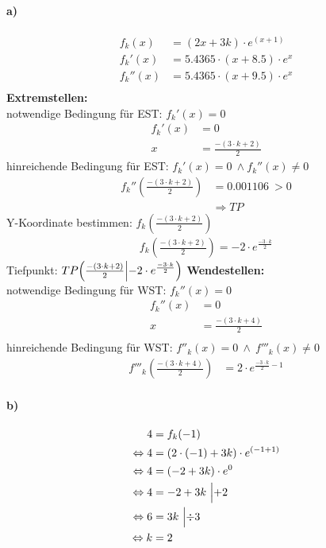 \documentclass[a4paper, 12pt]{report}
\begin{document}
	\paragraph{a)}
	\large
	\begin{align*}
		f_k(x) &= (2x + 3k) \cdot e^{(x+1)} \\
		f_k'(x) &= 5.4365 \cdot (x + 8.5) \cdot e^x \\
		f_k''(x) &= 5.4365 \cdot (x + 9.5) \cdot e^x \\
	\end{align*}
	\textbf{Extremstellen:} \\
	notwendige Bedingung für EST: $f_k'(x) = 0$
	\begin{align*}
		f_k'(x) &= 0 \\
		x &= \frac{-(3 \cdot k + 2)}{2}
	\end{align*}
	hinreichende Bedingung für EST: $f_k'(x) = 0\ \land f_k''(x) \neq 0$
	\begin{align*}
		f_k''(\frac{-(3 \cdot k + 2)}{2}) &= 0.001106\ > 0 \\
		&\Rightarrow TP
	\end{align*}
	Y-Koordinate bestimmen: $f_k(\frac{-(3 \cdot k + 2)}{2})$ \\
	\begin{align*}
		f_k(\frac{-(3 \cdot k + 2)}{2})= -2 \cdot e^{\frac{-3 \cdot k}{2}}
	\end{align*}
	Tiefpunkt: $
	TP\Bigl(\frac{-(3 \cdot k + 2)}{2}\Bigl| -2 \cdot e^{\frac{-3 \cdot k}{2}}\Bigl)$
	\newpage\noindent
	\textbf{Wendestellen:}
	\\
	notwendige Bedingung für WST: $f_k''(x) = 0$ \\
	\begin{align*}
		f_k''(x) &= 0 \\
		x &= \frac{-(3 \cdot k + 4)}{2} \\
	\end{align*}
	hinreichende Bedingung für WST: $f''_k(x) = 0\ \land\ f'''_k(x) \ne 0$\\
	\begin{align*}
		f'''_k(\frac{-(3 \cdot k + 4)}{2}) &= 2 \cdot e^{\frac{-3 \cdot k}{2} - 1}
	\end{align*}
	\paragraph{b)}
	\begin{align*}
		4 &= f_k(-1) \\
		\Leftrightarrow 4 &= (2 \cdot (-1) + 3k) \cdot e^{(-1+1)} \\
		\Leftrightarrow 4 &= (-2 + 3k) \cdot e^0 \\
		\Leftrightarrow 4 &= -2 + 3k\ \Bigl|+2 \\
		\Leftrightarrow 6 &= 3k\ \Bigl|\div 3 \\
		\Leftrightarrow k &= 2
	\end{align*}
	
\end{document}
